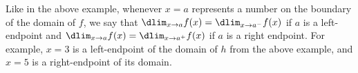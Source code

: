 \documentclass{book}
\begin{document}
Like in the above example, whenever $x=a$ represents a number on the boundary of the domain of $f$, we say that $\dlim_{x\to a} f(x) = \dlim_{x\to a^-} f(x) $ if $a$ is a left-endpoint and $\dlim_{x\to a} f(x)  = \dlim_{x\to a^+} f(x) $ if $a$ is a right endpoint. For example, $x=3$ is a left-endpoint of the domain of $h$ from the above example, and $x=5$ is a right-endpoint of its domain.

%
%
%
%
\end{document}
